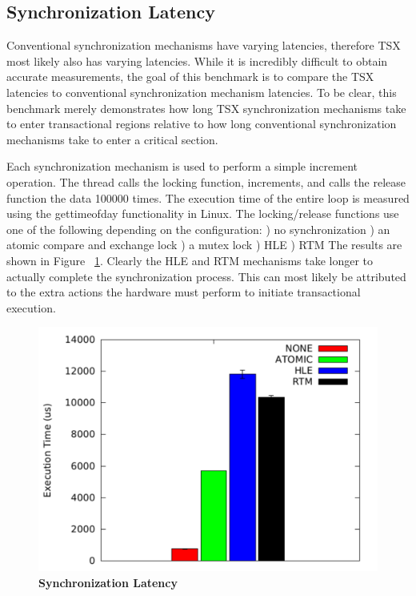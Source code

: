 \documentclass[a4paper]{article}
\begin{document}
\subsection{\textbf{Synchronization Latency}}

\indent
Conventional synchronization mechanisms have varying latencies, therefore TSX
most likely also has varying latencies.  While it is incredibly difficult to
obtain accurate measurements, the goal of this benchmark is to compare the TSX
latencies to conventional synchronization mechanism latencies.  To be clear,
this benchmark merely demonstrates how long TSX synchronization mechanisms take
to enter transactional regions relative to how long conventional synchronization
mechanisms take to enter a critical section.
\par

\indent
Each synchronization mechanism is used to perform a simple increment operation.
The thread calls the locking function, increments, and calls the release
function the data 100000 times.  The execution time of the entire loop is
measured using the gettimeofday functionality in Linux.  The locking/release
functions use one of the following depending on the configuration: 
) no synchronization 
) an atomic compare and exchange lock
) a mutex lock
) HLE
) RTM
The results are shown in Figure ~\ref{fig:tsx_latency}.  Clearly the HLE and RTM
mechanisms take longer to actually complete the synchronization process.  This
can most likely be attributed to the extra actions the hardware must perform to
initiate transactional execution.

\begin{figure}[H]
    \centering
    \graphicspath{ {./figures/} }
    \includegraphics[width=\textwidth,height=\textheight,keepaspectratio]{SyncBM}
    \caption{\textbf{Synchronization Latency}}
    \label{fig:tsx_latency}
\end{figure}
\end{document}
